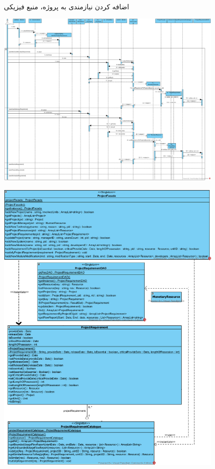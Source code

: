 \begin{landscape}
\begin{figure}[H]
	\caption{اضافه کردن نیازمندی به پروژه، منبع فیزیکی}
\end{figure}
\begin{figure}[H]
	\centering
	\includegraphics[scale=0.4]{img/sequence-design/AddRequirementToProject_MONETARY}
\end{figure}
\begin{figure}[H]
	\centering
	\includegraphics[scale=0.4]{img/sequence-design/AddRequirementToProject_MONETARYC}

\end{figure}
\end{landscape}
